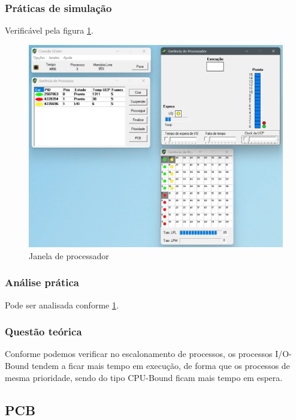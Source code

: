 \documentclass[a4paper,12pt]{article} %
\begin{document}
\subsubsection[]{Práticas de simulação}
Verificável pela figura \ref{fig4}.
\begin{figure}[htbp]
    \centering
    \includegraphics[scale=0.4]{../fig/fig4.png}
    \caption{Janela de processador}
    \label{fig4}
\end{figure}

\subsubsection[]{Análise prática}
Pode ser analisada conforme \ref{fig4}.
\subsubsection[]{Questão teórica}
Conforme podemos verificar no escalonamento de processos, os processos I/O-Bound tendem a ficar mais tempo em execução,
de forma que os processos de mesma prioridade, sendo do tipo CPU-Bound ficam mais tempo em espera.
\subsection[]{PCB}
\end{document}
